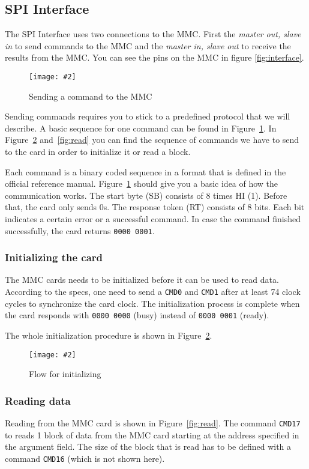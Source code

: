 \documentclass[12pt, a4paper]{article}
\newcommand{\image}[5]{
	\begin{figure}[#4]               %
		\centering                     %
		\texttt{[image: \#2]} %
		\caption{#3}                   %
		\label{fig:#5}                 %
	\end{figure}                     %
}
\begin{document}
\subsection{SPI Interface}

The SPI Interface uses two connections to the MMC. First the \emph{master out, slave in} to send commands to the MMC and the \emph{master in, slave out} to receive the results from the MMC. You can see the pins on the MMC in figure \ref{fig:interface}.

\image{0.8\textwidth}{../spi_mmc_command.pdf}{Sending a command to the MMC}{h}{command}

Sending commands requires you to stick to a predefined protocol that we will describe. A basic sequence for one command can be found in Figure~\ref{fig:command}. In Figure~\ref{fig:init} and~\ref{fig:read} you can find the sequence of commands we have to send to the card in order to initialize it or read a block.

Each command is a binary coded sequence in a format that is defined in the official reference manual. Figure~\ref{fig:command} should give you a basic idea of how the communication works. The start byte (SB) consists of 8 times HI (1). Before that, the card only sends 0s. The response token (RT) consists of 8 bits. Each bit indicates a certain error or a successful command. In case the command finished successfully, the card returns \texttt{0000 0001}.

\subsubsection{Initializing the card}

The MMC cards needs to be initialized before it can be used to read data. According to the specs, one need to send a \texttt{CMD0} and \texttt{CMD1} after at least 74 clock cycles to synchronize the card clock. The initialization process is complete when the card responds with \texttt{0000 0000} (busy) instead of \texttt{0000 0001} (ready).

The whole initialization procedure is shown in Figure~\ref{fig:init}.

\image{0.5\textwidth}{../flow_init_mmc.pdf}{Flow for initializing}{h}{init}

\subsubsection{Reading data}

Reading from the MMC card is shown in Figure~\ref{fig:read}. The command \texttt{CMD17} to reads 1 block of data from the MMC card starting at the address specified in the argument field. The size of the block that is read has to be defined with a command \texttt{CMD16} (which is not shown here).
\end{document}
